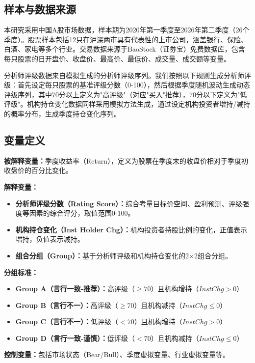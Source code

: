 \documentclass[12pt,a4paper]{article}
\begin{document}
\subsection{样本与数据来源}

本研究采用中国A股市场数据，样本期为2020年第一季度至2026年第二季度（26个季度）。股票样本包括12只在沪深两市具有代表性的上市公司，涵盖银行、保险、白酒、家电等多个行业。交易数据来源于BaoStock（证券宝）免费数据库，包含每只股票的日开盘价、收盘价、最高价、最低价、成交量、成交额等变量。

分析师评级数据来自模拟生成的分析师评级序列。我们按照以下规则生成分析师评级：首先设定每只股票的基准评级分数（0-100），然后根据季度随机波动生成动态评级序列，其中70分以上定义为"高评级"（对应"买入"推荐），70分以下定义为"低评级"。机构持仓变化数据同样采用模拟方法生成，通过设定机构投资者增持/减持的概率分布，生成季度持仓变化序列。

\subsection{变量定义}

\textbf{被解释变量：}季度收益率（Return），定义为股票在季度末的收盘价相对于季度初收盘价的百分比变化。

\textbf{解释变量：}
\begin{itemize}
  \item \textbf{分析师评级分数（Rating Score）：}综合考量目标价空间、盈利预测、评级强度等因素的综合评分，取值范围0-100。
  \item \textbf{机构持仓变化（Inst Holder Chg）：}机构投资者持股比例的变化，正值表示增持，负值表示减持。
  \item \textbf{组合分组（Group）：}基于分析师评级和机构持仓变化的2×2组合分组。
\end{itemize}

\textbf{分组标准：}
\begin{itemize}
  \item \textbf{Group A（言行一致-推荐）：}高评级（$\ge 70$）且机构增持（$Inst Chg > 0$）
  \item \textbf{Group B（言行不一）：}高评级（$\ge 70$）且机构减持（$Inst Chg \le 0$）
  \item \textbf{Group C（言行不一）：}低评级（$< 70$）且机构增持（$Inst Chg > 0$）
  \item \textbf{Group D（言行一致-谨慎）：}低评级（$< 70$）且机构减持（$Inst Chg \le 0$）
\end{itemize}

\textbf{控制变量：}包括市场状态（Bear/Bull）、季度虚拟变量、行业虚拟变量等。
\end{document}
